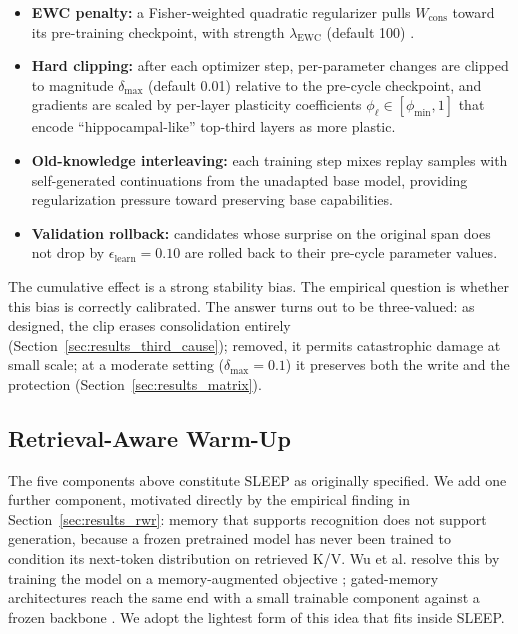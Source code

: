 \begin{itemize}[leftmargin=1.5em,itemsep=0.35em,topsep=0.3em]
    \item \textbf{EWC penalty:} a Fisher-weighted quadratic regularizer pulls $W_{\mathrm{cons}}$ toward its pre-training checkpoint, with strength $\lambda_{\mathrm{EWC}}$ (default 100) \citep{kirkpatrick2017overcoming}.
    \item \textbf{Hard clipping:} after each optimizer step, per-parameter changes are clipped to magnitude $\delta_{\max}$ (default 0.01) relative to the pre-cycle checkpoint, and gradients are scaled by per-layer plasticity coefficients $\phi_\ell \in [\phi_{\min}, 1]$ that encode ``hippocampal-like'' top-third layers as more plastic.
    \item \textbf{Old-knowledge interleaving:} each training step mixes replay samples with self-generated continuations from the unadapted base model, providing regularization pressure toward preserving base capabilities.
    \item \textbf{Validation rollback:} candidates whose surprise on the original span does not drop by $\epsilon_{\mathrm{learn}} = 0.10$ are rolled back to their pre-cycle parameter values.
\end{itemize}

The cumulative effect is a strong stability bias. The empirical question is whether this bias is correctly calibrated. The answer turns out to be three-valued: as designed, the clip erases consolidation entirely (Section~\ref{sec:results_third_cause}); removed, it permits catastrophic damage at small scale; at a moderate setting ($\delta_{\max}=0.1$) it preserves both the write and the protection (Section~\ref{sec:results_matrix}).

\subsection{Retrieval-Aware Warm-Up}
\label{sec:warmup_method}

The five components above constitute SLEEP as originally specified. We add one further component, motivated directly by the empirical finding in Section~\ref{sec:results_rwr}: memory that supports recognition does not support generation, because a frozen pretrained model has never been trained to condition its next-token distribution on retrieved K/V. Wu et al. resolve this by training the model on a memory-augmented objective \citep{wu2022memorizing}; gated-memory architectures reach the same end with a small trainable component against a frozen backbone \citep{gmemllm2026,wang2024memoryllm}. We adopt the lightest form of this idea that fits inside SLEEP.

